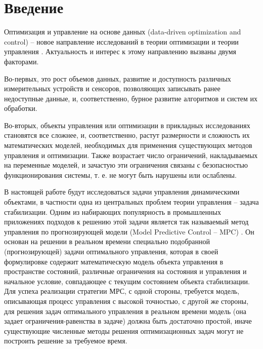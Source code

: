 \chapter*{Введение}


Оптимизация и управление на основе данных (data-driven optimization and control) – новое направление исследований в теории оптимизации и теории управления  \cite{dyn1, dyn2}. Актуальность и интерес к этому направлению вызваны двумя факторами.

Во-первых, это рост объемов данных, развитие и доступность различных измерительных устройств и сенсоров, позволяющих записывать ранее недоступные данные, и, соответственно, бурное развитие алгоритмов и систем их обработки. 

Во-вторых, объекты управления или оптимизации в прикладных исследованиях становятся все сложнее, и, соответственно, растут размерности и сложность их математических моделей, необходимых для применения существующих методов управления и оптимизации. Также возрастает число ограничений, накладываемых на переменные моделей, и зачастую эти ограничения связаны с безопасностью функционирования системы, т. е. не могут быть нарушены или ослаблены. 

В настоящей работе будут исследоваться задачи управления динамическими объектами, в частности одна из центральных проблем теории управления -- задача стабилизации. Одним из набирающих популярность в промышленных приложениях подходов к решению этой задачи является так называемый метод управления по прогнозирующей модели (Model Predictive Control – MPC) \cite{mpcIn, mpcIn2}. Он основан на решении в реальном времени специально подобранной (прогнозирующей) задачи оптимального управления, которая в своей формулировке содержит математическую модель объекта управления в пространстве состояний, различные ограничения на состояния и управления и начальное условие, совпадающее с текущим состоянием объекта стабилизации.  Для успеха реализации стратегии МРС, с одной стороны, требуется модель, описывающая процесс управления с высокой точностью, с другой же стороны, для решения задач оптимального управления в реальном времени модель (она задает ограничения-равенства в задаче) должна быть достаточно простой, иначе существующие численные методы решения оптимизационных задач могут не построить решение за требуемое время.

